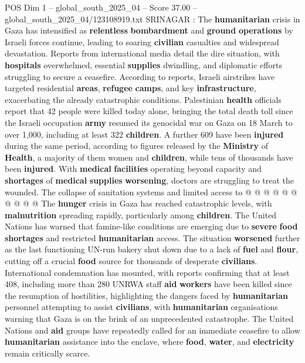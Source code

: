 \begin{textsample}{POS Dim 1 – global\_south\_2025\_04 – Score 37.00 – global\_south\_2025\_04/123108919.txt}  \label{ex:f1_pos_281}
SRINAGAR : The \textbf{humanitarian} crisis in Gaza has intensified as \textbf{relentless} \textbf{bombardment} and \textbf{ground} \textbf{operations} by Israeli forces continue, leading to soaring \textbf{civilian} casualties and widespread devastation.
Reports from international media detail the dire situation, with \textbf{hospitals} overwhelmed, essential \textbf{supplies} dwindling, and diplomatic efforts struggling to secure a ceasefire.
According to reports, Israeli airstrikes have targeted residential \textbf{areas}, \textbf{refugee} \textbf{camps}, and key \textbf{infrastructure}, exacerbating the already catastrophic conditions.
Palestinian \textbf{health} officials report that 42 people were killed today alone, bringing the total death toll since the Israeli occupation \textbf{army} resumed its genocidal war on Gaza on 18 March to over 1,000, including at least 322 \textbf{children}.
A further 609 have been \textbf{injured} during the same period, according to figures released by the \textbf{Ministry} of \textbf{Health}, a majority of them women and \textbf{children}, while tens of thousands have been \textbf{injured}.
With \textbf{medical} \textbf{facilities} operating beyond capacity and \textbf{shortages} of \textbf{medical} \textbf{supplies} \textbf{worsening}, doctors are struggling to treat the wounded.
The collapse of sanitation systems and limited access to @ @ @ @ @ @ @ @ @ @ The \textbf{hunger} crisis in Gaza has reached catastrophic levels, with \textbf{malnutrition} spreading rapidly, particularly among \textbf{children}.
The United Nations has warned that famine-like conditions are emerging due to \textbf{severe} \textbf{food} \textbf{shortages} and restricted \textbf{humanitarian} access.
The situation \textbf{worsened} further as the last functioning UN-run bakery shut down due to a lack of \textbf{fuel} and \textbf{flour}, cutting off a crucial \textbf{food} source for thousands of desperate \textbf{civilians}.
International condemnation has mounted, with reports confirming that at least 408, including more than 280 UNRWA staff \textbf{aid} \textbf{workers} have been killed since the resumption of hostilities, highlighting the dangers faced by \textbf{humanitarian} personnel attempting to assist \textbf{civilians}, with \textbf{humanitarian} organisations warning that Gaza is on the brink of an unprecedented catastrophe.
The United Nations and \textbf{aid} groups have repeatedly called for an immediate ceasefire to allow \textbf{humanitarian} assistance into the enclave, where \textbf{food}, \textbf{water}, and \textbf{electricity} remain critically scarce.

\end{textsample}
